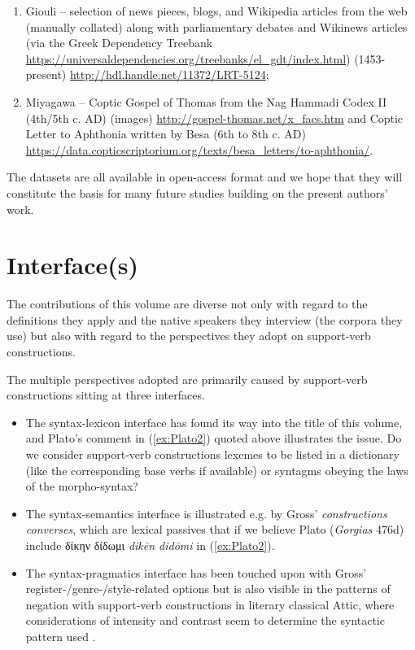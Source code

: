 \documentclass[output=paper,colorlinks,citecolor=brown]{langscibook}
\begin{document}
\begin{enumerate}
\item Giouli – selection of news pieces, blogs, and Wikipedia articles from the web (manually collated) along with parliamentary debates and Wikinews articles (via the Greek Dependency Treebank \url{https://universaldependencies.org/treebanks/el_gdt/index.html}) (1453-present) \url{http://hdl.handle.net/11372/LRT-5124};


\bigskip
\item Miyagawa – Coptic Gospel of Thomas from the Nag Hammadi Codex II (4th/5th c. AD) (images) \url{http://gospel-thomas.net/x_facs.htm} and Coptic Letter to Aphthonia written by Besa (6th to 8th c. AD) \url{https://data.copticscriptorium.org/texts/besa_letters/to-aphthonia/}. 

\end{enumerate} 



The datasets are all available in open-access format and we hope that they will constitute the basis for many future studies building on the present authors’ work. 


\section{Interface(s)}
The contributions of this volume are diverse not only with regard to the definitions they apply and the native speakers they interview (the corpora they use) but also with regard to the perspectives they adopt on support-verb constructions. 


The multiple perspectives adopted are primarily caused by support-verb constructions sitting at three interfaces. 
\begin{itemize}
    \item The syntax-lexicon interface has found its way into the title of this volume, and Plato’s comment in (\ref{ex:Plato2}) quoted above illustrates the issue. Do we consider support-verb constructions lexemes to be listed in a dictionary (like the corresponding base verbs if available) or syntagms obeying the laws of the morpho-syntax? 
    \item The syntax-semantics interface is illustrated e.g. by Gross’ \textit{constructions converses}, which are lexical passives that if we believe Plato (\textit{Gorgias} 476d) include δίκην δίδωμι \textit{dikēn didōmi} in (\ref{ex:Plato2}). 
    \item The syntax-pragmatics interface has been touched upon with Gross’ register-/genre-/style-related options but is also visible in the patterns of negation with support-verb constructions in literary classical Attic, where considerations of intensity and contrast seem to determine the syntactic pattern used \citep{fendelHavenGotClue2023}. 
\end{itemize}
\end{document}
